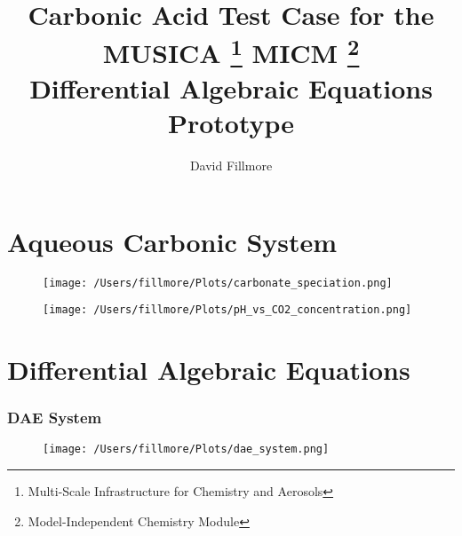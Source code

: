 \documentclass{beamer}
\title[MUSICA DAE]{Carbonic Acid Test Case for the \\
MUSICA
\footnote{Multi-Scale Infrastructure for Chemistry and Aerosols}
MICM
\footnote{Model-Independent Chemistry Module}
\\ Differential Algebraic Equations Prototype}
\author[Fillmore]{David Fillmore \\
\vspace{-0.35in}}
\begin{document}
\frame{\titlepage}

\section{Aqueous Carbonic System}

\begin{frame}

\end{frame}

\begin{frame}

\end{frame}

\begin{frame}

\end{frame}

\begin{frame}
\begin{figure}
\texttt{[image: /Users/fillmore/Plots/carbonate\_speciation.png]}
\end{figure}
\end{frame}

\begin{frame}
\begin{figure}
\texttt{[image: /Users/fillmore/Plots/pH\_vs\_CO2\_concentration.png]}
\end{figure}
\end{frame}

\section{Differential Algebraic Equations}
\frametitle{DAE System}

\begin{frame}

\end{frame}

\begin{frame}

\end{frame}

\begin{frame}

\end{frame}

\begin{frame}


\end{frame}

\begin{frame}


\end{frame}

\begin{frame}
\begin{figure}
\texttt{[image: /Users/fillmore/Plots/dae\_system.png]}
\end{figure}
\end{frame}
\end{document}
